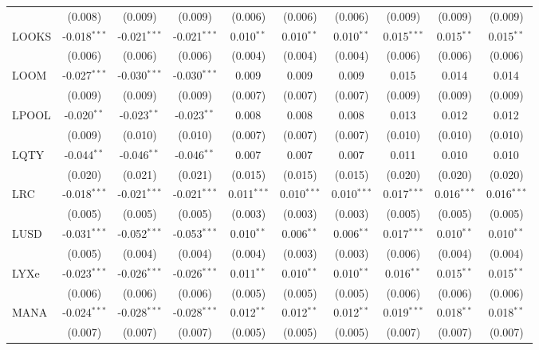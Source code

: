 \begin{table}[!htbp]
\begin{tabular}{@{\extracolsep{5pt}}lccccccccc}
  & (0.008) & (0.009) & (0.009) & (0.006) & (0.006) & (0.006) & (0.009) & (0.009) & (0.009) \\
 LOOKS & -0.018$^{***}$ & -0.021$^{***}$ & -0.021$^{***}$ & 0.010$^{**}$ & 0.010$^{**}$ & 0.010$^{**}$ & 0.015$^{***}$ & 0.015$^{**}$ & 0.015$^{**}$ \\
  & (0.006) & (0.006) & (0.006) & (0.004) & (0.004) & (0.004) & (0.006) & (0.006) & (0.006) \\
 LOOM & -0.027$^{***}$ & -0.030$^{***}$ & -0.030$^{***}$ & 0.009$^{}$ & 0.009$^{}$ & 0.009$^{}$ & 0.015$^{}$ & 0.014$^{}$ & 0.014$^{}$ \\
  & (0.009) & (0.009) & (0.009) & (0.007) & (0.007) & (0.007) & (0.009) & (0.009) & (0.009) \\
 LPOOL & -0.020$^{**}$ & -0.023$^{**}$ & -0.023$^{**}$ & 0.008$^{}$ & 0.008$^{}$ & 0.008$^{}$ & 0.013$^{}$ & 0.012$^{}$ & 0.012$^{}$ \\
  & (0.009) & (0.010) & (0.010) & (0.007) & (0.007) & (0.007) & (0.010) & (0.010) & (0.010) \\
 LQTY & -0.044$^{**}$ & -0.046$^{**}$ & -0.046$^{**}$ & 0.007$^{}$ & 0.007$^{}$ & 0.007$^{}$ & 0.011$^{}$ & 0.010$^{}$ & 0.010$^{}$ \\
  & (0.020) & (0.021) & (0.021) & (0.015) & (0.015) & (0.015) & (0.020) & (0.020) & (0.020) \\
 LRC & -0.018$^{***}$ & -0.021$^{***}$ & -0.021$^{***}$ & 0.011$^{***}$ & 0.010$^{***}$ & 0.010$^{***}$ & 0.017$^{***}$ & 0.016$^{***}$ & 0.016$^{***}$ \\
  & (0.005) & (0.005) & (0.005) & (0.003) & (0.003) & (0.003) & (0.005) & (0.005) & (0.005) \\
 LUSD & -0.031$^{***}$ & -0.052$^{***}$ & -0.053$^{***}$ & 0.010$^{**}$ & 0.006$^{**}$ & 0.006$^{**}$ & 0.017$^{***}$ & 0.010$^{**}$ & 0.010$^{**}$ \\
  & (0.005) & (0.004) & (0.004) & (0.004) & (0.003) & (0.003) & (0.006) & (0.004) & (0.004) \\
 LYXe & -0.023$^{***}$ & -0.026$^{***}$ & -0.026$^{***}$ & 0.011$^{**}$ & 0.010$^{**}$ & 0.010$^{**}$ & 0.016$^{**}$ & 0.015$^{**}$ & 0.015$^{**}$ \\
  & (0.006) & (0.006) & (0.006) & (0.005) & (0.005) & (0.005) & (0.006) & (0.006) & (0.006) \\
 MANA & -0.024$^{***}$ & -0.028$^{***}$ & -0.028$^{***}$ & 0.012$^{**}$ & 0.012$^{**}$ & 0.012$^{**}$ & 0.019$^{***}$ & 0.018$^{**}$ & 0.018$^{**}$ \\
  & (0.007) & (0.007) & (0.007) & (0.005) & (0.005) & (0.005) & (0.007) & (0.007) & (0.007) \\

\end{tabular}
\end{table}
